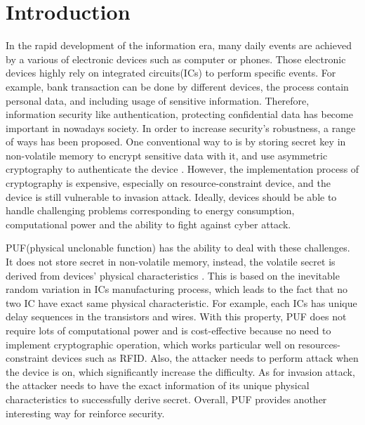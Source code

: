 \chapter{Introduction}
In the rapid development of the information era, many daily events are achieved by a various of electronic devices such as computer or phones.
Those electronic devices highly rely on integrated circuits(ICs) to perform specific events. For example, bank transaction can be done by different devices,
the process contain personal data, and including usage of sensitive information. Therefore, information security like authentication, protecting confidential data
has become important in nowadays society. In order to increase security's robustness, a range of ways has been proposed. One conventional way to is by storing secret key in non-volatile memory to encrypt sensitive data with it,
and use asymmetric cryptography to authenticate the device \cite{Reference3}. However, the implementation process of cryptography is expensive, especially on resource-constraint device, and the device is still vulnerable to invasion attack. Ideally, devices should be able to handle challenging problems corresponding to energy consumption, 
computational power and the ability to fight against cyber attack. \par

PUF(physical unclonable function) has the ability to deal with these challenges. It does not store secret in non-volatile memory, instead, the volatile secret is derived from devices' physical characteristics \cite{Reference3}.
This is based on the inevitable random variation in ICs manufacturing process, which leads to the fact that no two IC have exact same physical characteristic. For example, each ICs has unique delay sequences in the transistors and wires.
With this property, PUF does not require lots of computational power and is cost-effective because no need to implement cryptographic operation, which works particular well on
resources-constraint devices such as RFID. Also, the attacker needs to perform attack when the device is on, which significantly increase the difficulty. As for invasion attack, 
the attacker needs to have the exact information of its unique physical characteristics to successfully derive secret. Overall, PUF provides another interesting way for reinforce security.

